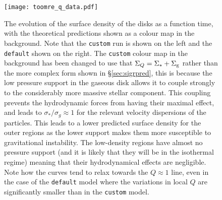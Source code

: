 \begin{figure}
    \centering
    \texttt{[image: toomre\_q\_data.pdf]}
    \caption{The evolution of the surface density of the disks as a function time, with the theoretical predictions shown as a colour map in the background. Note that the {\tt custom} run is shown on the left and the {\tt default} shown on the right. The {\tt custom} colour map in the background has been changed to use that $\Sigma_Q = \Sigma_* + \Sigma_\mathrm{g}$ rather than the more complex form shown in \S \ref{sec:sigrpred}, this is because the low pressure support in the gaseous disk allows it to couple strongly to the considerably more massive stellar component. This coupling prevents the hydrodynamic forces from having their maximal effect, and leads to $\sigma_*/\sigma_g \approx 1$ for the relevant velocity dispersions of the particles. This leads to a lower predicted surface density for the outer regions as the lower support makes them more susceptible to gravitational instability. The low-density regions have almost no pressure support (and it is likely that they will be in the isothermal regime) meaning that their hydrodynamical effects are negligible. Note how the curves tend to relax towards the $Q\approx1$ line, even in the case of the {\tt default} model where the variations in local $Q$ are significantly smaller than in the {\tt custom} model.}
    \label{fig:toomreqthr_dat}
\end{figure}

